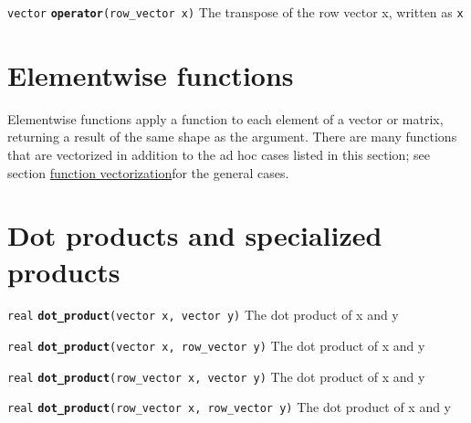 \documentclass[
  10pt,
]{book}
\begin{document}
\texttt{vector} \textbf{\texttt{operator\textquotesingle{}}}\texttt{(row\_vector\ x)}\newline
The transpose of the row vector x, written as \texttt{x\textquotesingle{}}

\hypertarget{elementwise-functions}{%
\section{Elementwise functions}\label{elementwise-functions}}

Elementwise functions apply a function to each element of a vector or
matrix, returning a result of the same shape as the argument. There
are many functions that are vectorized in addition to the ad hoc cases
listed in this section; see section \protect\hyperlink{fun-vectorization}{function vectorization}for the
general cases.

\hypertarget{dot-products-and-specialized-products}{%
\section{Dot products and specialized products}\label{dot-products-and-specialized-products}}


\texttt{real} \textbf{\texttt{dot\_product}}\texttt{(vector\ x,\ vector\ y)}\newline
The dot product of x and y


\texttt{real} \textbf{\texttt{dot\_product}}\texttt{(vector\ x,\ row\_vector\ y)}\newline
The dot product of x and y


\texttt{real} \textbf{\texttt{dot\_product}}\texttt{(row\_vector\ x,\ vector\ y)}\newline
The dot product of x and y


\texttt{real} \textbf{\texttt{dot\_product}}\texttt{(row\_vector\ x,\ row\_vector\ y)}\newline
The dot product of x and y

\end{document}
